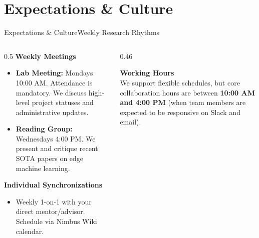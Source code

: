 \section{Expectations \& Culture}

\begin{frame}{Expectations \& Culture}{Weekly Research Rhythms}
  \begin{columns}[T]
    \begin{column}{0.5\textwidth}
      \textbf{Weekly Meetings}
      \begin{itemize}
        \item \textbf{Lab Meeting:} Mondays 10:00 AM. Attendance is mandatory. We discuss high-level project statuses and administrative updates.
        \item \textbf{Reading Group:} Wednesdays 4:00 PM. We present and critique recent SOTA papers on edge machine learning.
      \end{itemize}
      
      \vspace{0.3cm}
      \textbf{Individual Synchronizations}
      \begin{itemize}
        \item Weekly 1-on-1 with your direct mentor/advisor. Schedule via Nimbus Wiki calendar.
      \end{itemize}
    \end{column}
    
    \begin{column}{0.46\textwidth}
      \begin{highlightbox}
        \textbf{Working Hours} \\
        We support flexible schedules, but core collaboration hours are between \textbf{10:00 AM and 4:00 PM} (when team members are expected to be responsive on Slack and email).
      \end{highlightbox}
    \end{column}
  \end{columns}
\end{frame}

